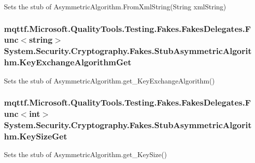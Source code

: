 Sets the stub of Asymmetric\-Algorithm.\-From\-Xml\-String(\-String xml\-String)

\hypertarget{class_system_1_1_security_1_1_cryptography_1_1_fakes_1_1_stub_asymmetric_algorithm_af40f692f430f6d5a1980ff47b32e7109}{
\subsubsection[{Key\-Exchange\-Algorithm\-Get}]{\setlength{\rightskip}{0pt plus 5cm}mqttf.\-Microsoft.\-Quality\-Tools.\-Testing.\-Fakes.\-Fakes\-Delegates.\-Func$<$string$>$ System.\-Security.\-Cryptography.\-Fakes.\-Stub\-Asymmetric\-Algorithm.\-Key\-Exchange\-Algorithm\-Get}}\label{class_system_1_1_security_1_1_cryptography_1_1_fakes_1_1_stub_asymmetric_algorithm_af40f692f430f6d5a1980ff47b32e7109}


Sets the stub of Asymmetric\-Algorithm.\-get\-\_\-\-Key\-Exchange\-Algorithm()

\hypertarget{class_system_1_1_security_1_1_cryptography_1_1_fakes_1_1_stub_asymmetric_algorithm_a015036b894984c161102bb047fab06ff}{
\subsubsection[{Key\-Size\-Get}]{\setlength{\rightskip}{0pt plus 5cm}mqttf.\-Microsoft.\-Quality\-Tools.\-Testing.\-Fakes.\-Fakes\-Delegates.\-Func$<$int$>$ System.\-Security.\-Cryptography.\-Fakes.\-Stub\-Asymmetric\-Algorithm.\-Key\-Size\-Get}}\label{class_system_1_1_security_1_1_cryptography_1_1_fakes_1_1_stub_asymmetric_algorithm_a015036b894984c161102bb047fab06ff}


Sets the stub of Asymmetric\-Algorithm.\-get\-\_\-\-Key\-Size()

